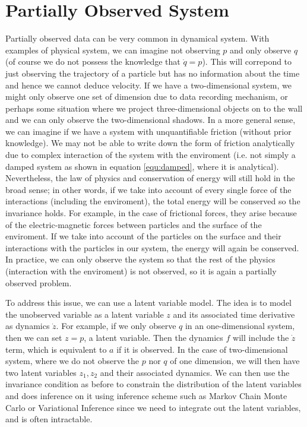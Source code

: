 \documentclass{statsmsc}
\begin{document}
\section{Partially Observed System}
Partially observed data can be very common in dynamical system.
With examples of physical system, we can imagine not observing $p$ and only observe $q$ (of course we do not possess the knowledge that $\dot{q}=p$).
This will correpond to just observing the trajectory of a particle but has no information about the time and hence we cannot deduce velocity.
If we have a two-dimensional system, we might only observe one set of dimension due to data recording mechanism, or perhaps some situation where we project three-dimensional objects on to the wall and we can only observe the two-dimensional shadows.
In a more general sense, we can imagine if we have a system with unquantifiable friction (without prior knowledge).
We may not be able to write down the form of friction analytically due to complex interaction of the system with the enviroment (i.e. not simply a damped system as shown in equation \ref{equ:damped}, where it is analytical).
Nevertheless, the law of physics and conservation of energy will still hold in the broad sense; 
in other words, if we take into account of every single force of the interactions (including the enviroment), the total energy will be conserved so the invariance holds. 
For example, in the case of frictional forces, they arise because of the electric-magnetic forces between particles and the surface of the enviroment.
If we take into account of the particles on the surface and their interactions with the particles in our system, the energy will again be conserved. 
In practice, we can only observe the system so that the rest of the physics (interaction with the enviroment) is not observed, so it is again a partially observed problem.

To address this issue, we can use a latent variable model. 
The idea is to model the unobserved variable as a latent variable $z$ and its associated time derivative as dynamics $\dot{z}$.
For example, if we only observe $q$ in an one-dimensional system, then we can set $z=p$, a latent variable. 
Then the dynamics $f$ will include the $\dot{z}$ term, which is equivalent to $a$ if it is observed. 
In the case of two-dimensional system, where we do not observe the $p$ nor $q$ of one dimension, we will then have two latent variables $z_1, z_2$ and their associated dynamics.
We can then use the invariance condition as before to constrain the distribution of the latent variables and does inference on it using inference scheme such as Markov Chain Monte Carlo or Variational Inference since we need to integrate out the latent variables, and is often intractable.
\end{document}
